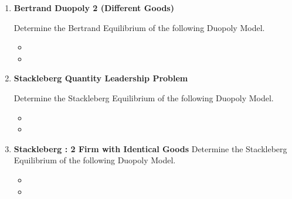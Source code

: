 \documentclass[]{report}
\begin{document}
\begin{enumerate}
\begin{itemize}
	
	\item
	
	\item
	
\end{itemize}
\item \textbf{Bertrand Duopoly 2 (Different Goods)}


Determine the Bertrand Equilibrium of the following Duopoly Model.

\begin{itemize}
	
	\item
	
	\item
	
\end{itemize}
\item \textbf{Stackleberg Quantity Leadership Problem}


Determine the Stackleberg Equilibrium of the following Duopoly Model.

\begin{itemize}
	
	\item
	
	\item
	
\end{itemize}

\item \textbf{Stackleberg : 2 Firm with Identical Goods}
Determine the Stackleberg Equilibrium of the following Duopoly Model.

\begin{itemize}
	
	\item
	
	\item
	

\end{itemize}
\end{enumerate}
\end{document}
